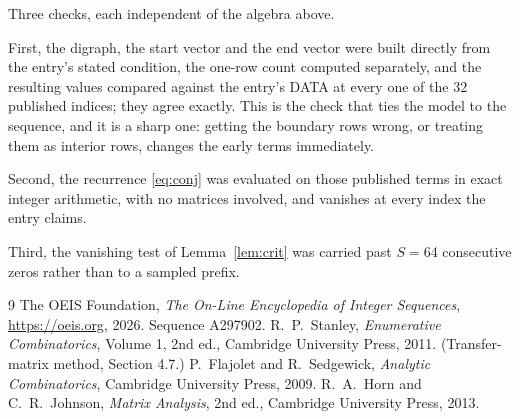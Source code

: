 \documentclass[11pt,a4paper]{article}
\theoremstyle{plain}
\theoremstyle{definition}
\begin{document}
Three checks, each independent of the algebra above.

First, the digraph, the start vector and the end vector were built directly from the
entry's stated condition, the one-row count computed separately, and the resulting values
compared against the entry's DATA at every one of the $32$ published indices; they
agree exactly. This is the check that ties the model to the sequence, and it is a sharp one:
getting the boundary rows wrong, or treating them as interior rows, changes the early terms
immediately.

Second, the recurrence \eqref{eq:conj} was evaluated on those published terms in exact
integer arithmetic, with no matrices involved, and vanishes at every index the entry claims.

Third, the vanishing test of Lemma~\ref{lem:crit} was carried past $S=64$ consecutive
zeros rather than to a sampled prefix.

\begin{thebibliography}{9}
 The OEIS Foundation, \emph{The On-Line Encyclopedia of Integer
Sequences}, \url{https://oeis.org}, 2026. Sequence A297902.
 R.~P.~Stanley, \emph{Enumerative Combinatorics}, Volume 1, 2nd ed.,
Cambridge University Press, 2011. (Transfer-matrix method, Section 4.7.)
 P.~Flajolet and R.~Sedgewick, \emph{Analytic Combinatorics}, Cambridge
University Press, 2009.
 R.~A.~Horn and C.~R.~Johnson, \emph{Matrix Analysis}, 2nd ed., Cambridge
University Press, 2013.
\end{thebibliography}
\end{document}
